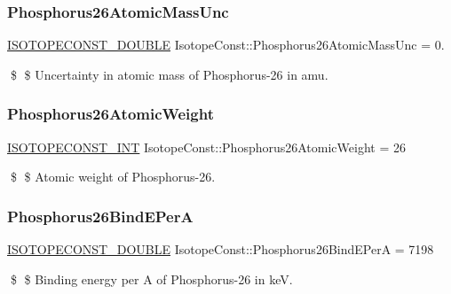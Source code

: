 \subsubsection{\texorpdfstring{Phosphorus26\+Atomic\+Mass\+Unc}{Phosphorus26AtomicMassUnc}}
{\footnotesize\ttfamily \mbox{\hyperlink{group___isotope_const-_macros_ga8f45a7272ce02c0b4c65c44636ed719a}{I\+S\+O\+T\+O\+P\+E\+C\+O\+N\+S\+T\+\_\+\+D\+O\+U\+B\+LE}} Isotope\+Const\+::\+Phosphorus26\+Atomic\+Mass\+Unc = 0.}

\$ \$ Uncertainty in atomic mass of Phosphorus-\/26 in amu. \mbox{\label{group___isotope_const-_phosphorus-_p26_ga624ff3289a995e37657ba74e9806047a}} 
\subsubsection{\texorpdfstring{Phosphorus26\+Atomic\+Weight}{Phosphorus26AtomicWeight}}
{\footnotesize\ttfamily \mbox{\hyperlink{group___isotope_const-_macros_ga5f18360b3e99483a35c32d789e62621c}{I\+S\+O\+T\+O\+P\+E\+C\+O\+N\+S\+T\+\_\+\+I\+NT}} Isotope\+Const\+::\+Phosphorus26\+Atomic\+Weight = 26}

\$ \$ Atomic weight of Phosphorus-\/26. \mbox{\label{group___isotope_const-_phosphorus-_p26_ga3fe3c5090d8fac59d3f2648c18bdd2a3}} 
\subsubsection{\texorpdfstring{Phosphorus26\+Bind\+E\+PerA}{Phosphorus26BindEPerA}}
{\footnotesize\ttfamily \mbox{\hyperlink{group___isotope_const-_macros_ga8f45a7272ce02c0b4c65c44636ed719a}{I\+S\+O\+T\+O\+P\+E\+C\+O\+N\+S\+T\+\_\+\+D\+O\+U\+B\+LE}} Isotope\+Const\+::\+Phosphorus26\+Bind\+E\+PerA = 7198}

\$ \$ Binding energy per A of Phosphorus-\/26 in keV. \mbox{\label{group___isotope_const-_phosphorus-_p26_ga951808dd17bd49e963394a47869554c2}} 
